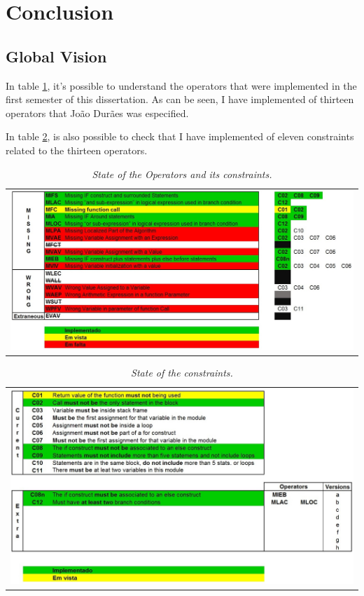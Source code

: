 \clearpage
\section{Conclusion}

\subsection{Global Vision}

In table \ref{tab:operators_status}, it's possible to understand the operators that were implemented in the first semester of this dissertation. As can be seen, I have implemented  of thirteen operators that João Durães was especified.

In table \ref{tab:constraints_status}, is also possible to check that I have implemented  of eleven constraints related to the thirteen operators.

\begin{table}[ht]
\begin{tabular}{c}
\includegraphics[width=1.1\textwidth]{img/operators_status.jpg}
\end{tabular}
\caption{\small \sl State of the Operators and its constraints.\label{tab:operators_status}}
\end{table}



\begin{table}[ht]
\begin{tabular}{c}
\includegraphics[width=1.1\textwidth]{img/constraints_status.jpg}
\end{tabular}
\caption{\small \sl State of the constraints.\label{tab:constraints_status}}
\end{table}

